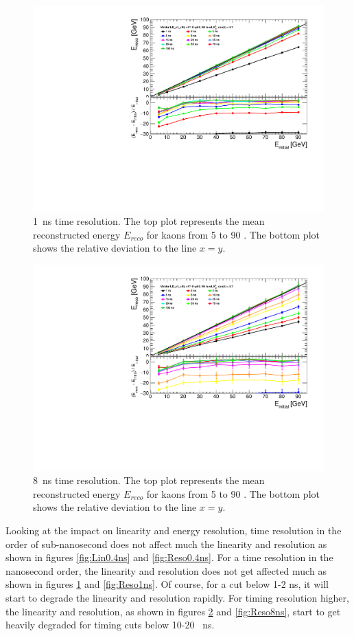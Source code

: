 \begin{figure}[htbp!]
  \centering
  \includegraphics[width=0.7\linewidth]{../Thesis_Plots/ILD/Smearing_1ns/Plots/Linearity_TimeCuts_Smearing2}
  \caption{\SI{1}{\nano\second} time resolution. The top plot represents the mean reconstructed energy $E_{reco}$ for kaons from 5 to 90 \GeV. The bottom plot shows the relative deviation to the line $x=y$.} \label{fig:Lin1ns}
\end{figure}

\begin{figure}[htbp!]
  \centering
  \includegraphics[width=0.7\linewidth]{../Thesis_Plots/ILD/Smearing_8ns/Plots/Linearity_TimeCuts_Smearing3}
  \caption{\SI{8}{\nano\second} time resolution. The top plot represents the mean reconstructed energy $E_{reco}$ for kaons from 5 to 90 \GeV. The bottom plot shows the relative deviation to the line $x=y$.}  \label{fig:Lin8ns}
\end{figure}

Looking at the impact on linearity and energy resolution, time resolution in the order of sub-nanosecond does not affect much the linearity and resolution as shown in figures \ref{fig:Lin0.4ns} and \ref{fig:Reso0.4ns}. For a time resolution in the nanosecond order, the linearity and resolution does not get affected much as shown in figures \ref{fig:Lin1ns} and \ref{fig:Reso1ns}. Of course, for a cut below 1-2 ns, it will start to degrade the linearity and resolution rapidly. For timing resolution higher, the linearity and resolution, as shown in figures \ref{fig:Lin8ns} and \ref{fig:Reso8ns}, start to get heavily degraded for timing cuts below 10-20 \SI{}{\nano\second}.

